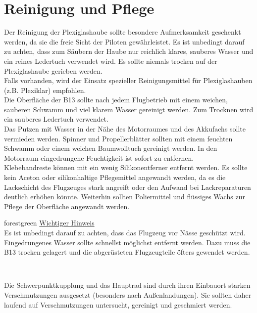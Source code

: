 \section{Reinigung und Pflege}
Der Reinigung der Plexiglashaube sollte besondere Aufmerksamkeit geschenkt werden, da sie die freie Sicht der Piloten gewährleistet. Es ist unbedingt darauf zu achten, dass zum Säubern der Haube nur reichlich klares, sauberes Wasser und ein reines Ledertuch verwendet wird. Es sollte niemals trocken auf der Plexiglashaube gerieben werden. \\
\newline
Falls vorhanden, wird der Einsatz spezieller Reinigungsmittel für Plexiglashauben (z.B. Plexiklar) empfohlen. \\
\newline
Die Oberfläche der B13 sollte nach jedem Flugbetrieb mit einem weichen, sauberen Schwamm und viel klarem Wasser gereinigt werden. Zum Trocknen wird ein sauberes Ledertuch verwendet. \\
\newline
Das Putzen mit Wasser in der Nähe des Motorraumes und des Akkufachs sollte vermieden werden. Spinner und Propellerblätter sollten mit einem feuchten Schwamm oder einem weichen Baumwolltuch gereinigt werden.
In den Motorraum eingedrungene Feuchtigkeit ist sofort zu entfernen.\\
Klebebandreste können mit ein wenig Silikonentferner entfernt werden. Es sollte kein Aceton oder silikonhaltige Pflegemittel angewandt werden, da es die Lackschicht des Flugzeuges stark angreift oder den Aufwand bei Lackreparaturen deutlich erhöhen könnte. Weiterhin sollten Poliermittel und flüssiges Wachs zur Pflege der Oberfläche angewandt werden. \\
\newline
\begin{color}{forestgreen}
\large{\underline{Wichtiger Hinweis}}\\
Es ist unbedingt darauf zu achten, dass das Flugzeug vor Nässe geschützt wird. 	Eingedrungenes Wasser sollte schnellst möglichst entfernt werden. Dazu muss die B13 trocken gelagert und die abgerüsteten Flugzeugteile  öfters gewendet 	werden. 
\end{color}\\
\newline

Die Schwerpunktkupplung und das Hauptrad sind durch ihren Einbauort starken Verschmutzungen ausgesetzt (besonders nach Außenlandungen). Sie sollten daher laufend auf Verschmutzungen untersucht, gereinigt und geschmiert werden. 